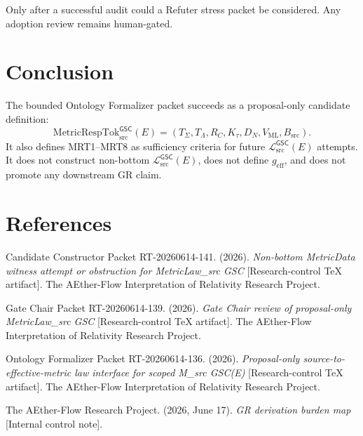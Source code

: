 \documentclass[11pt]{article}
\newcommand{\MetricRespTok}{\mathrm{MetricRespTok}_{\mathrm{src}}^{\mathsf{GSC}}}
\newcommand{\MetricData}{\mathcal{L}_{\mathrm{src}}^{\mathsf{GSC}}}
\newcommand{\geff}{g_{\mathrm{eff}}}
\begin{document}
Only after a successful audit could a Refuter stress packet be considered.
Any adoption review remains human-gated.

\section{Conclusion}

The bounded Ontology Formalizer packet succeeds as a proposal-only candidate
definition:
\[
  \MetricRespTok(E)
  =
  (
    T_{\Sigma},
    T_{\Lambda},
    R_C,
    K_{\tau},
    D_N,
    V_{\mathrm{ML}},
    B_{\mathrm{src}}
  ).
\]
It also defines MRT1--MRT8 as sufficiency criteria for future
\(\MetricData(E)\) attempts. It does not construct non-bottom
\(\MetricData(E)\), does not define \(\geff\), and does not promote any
downstream GR claim.

\section*{References}

Candidate Constructor Packet RT-20260614-141. (2026). \textit{Non-bottom
MetricData witness attempt or obstruction for MetricLaw\_src GSC}
[Research-control TeX artifact]. The AEther-Flow Interpretation of Relativity
Research Project.

Gate Chair Packet RT-20260614-139. (2026). \textit{Gate Chair review of
proposal-only MetricLaw\_src GSC} [Research-control TeX artifact]. The
AEther-Flow Interpretation of Relativity Research Project.

Ontology Formalizer Packet RT-20260614-136. (2026). \textit{Proposal-only
source-to-effective-metric law interface for scoped M\_src GSC(E)}
[Research-control TeX artifact]. The AEther-Flow Interpretation of Relativity
Research Project.

The AEther-Flow Research Project. (2026, June 17). \textit{GR derivation
burden map} [Internal control note].
\end{document}
